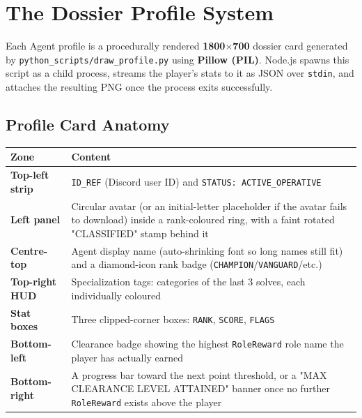 \documentclass[12pt,a4paper]{report}
\newcommand{\file}[1]{\texttt{\color{cyberpurple!80!black}#1}}
\begin{document}
\chapter{The Dossier Profile System}

Each Agent profile is a procedurally rendered \textbf{1800$\times$700} dossier card generated by
\file{python\_scripts/draw\_profile.py} using \textbf{Pillow (PIL)}. Node.js spawns this script as
a child process, streams the player's stats to it as JSON over \texttt{stdin}, and attaches the
resulting PNG once the process exits successfully.

\section{Profile Card Anatomy}

\begin{center}
\begin{tabular}{>{\bfseries}p{3.5cm} p{9.5cm}}
\toprule
Zone & Content \\
\midrule
Top-left strip  & \texttt{ID\_REF} (Discord user ID) and \texttt{STATUS: ACTIVE\_OPERATIVE} \\
Left panel      & Circular avatar (or an initial-letter placeholder if the avatar fails to
                   download) inside a rank-coloured ring, with a faint rotated "CLASSIFIED" stamp
                   behind it \\
Centre-top      & Agent display name (auto-shrinking font so long names still fit) and a
                   diamond-icon rank badge (\texttt{CHAMPION}/\texttt{VANGUARD}/etc.) \\
Top-right HUD   & Specialization tags: categories of the last 3 solves, each individually coloured \\
Stat boxes      & Three clipped-corner boxes: \texttt{RANK}, \texttt{SCORE}, \texttt{FLAGS} \\
Bottom-left     & Clearance badge showing the highest \texttt{RoleReward} role name the player has
                   actually earned \\
Bottom-right    & A progress bar toward the next point threshold, or a "MAX CLEARANCE LEVEL
                   ATTAINED" banner once no further \texttt{RoleReward} exists above the player \\
\bottomrule
\end{tabular}
\end{center}
\end{document}
